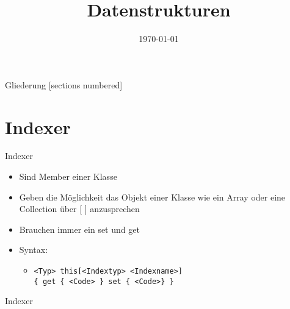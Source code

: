 



\title{Datenstrukturen}
\date{\today}




\maketitle

\begin{frame}{Gliederung}
	[sections numbered]
	\tableofcontents
\end{frame}

\section{Indexer}
\begin{frame}{Indexer}
	\begin{itemize}
		\item Sind Member einer Klasse
		\item Geben die Möglichkeit das Objekt einer Klasse wie ein Array oder eine Collection über \alert{[ ]} anzusprechen
		\item Brauchen immer ein \alert{set} und \alert{get}
		\item Syntax:
		\begin{itemize}
			\item \texttt{\alert{<Typ>} this[\alert{<Indextyp> <Indexname>}]\\ \{ get \{ \alert{<Code>} \} set \{ \alert{<Code>}\} \}}
		\end{itemize}
	\end{itemize}
\end{frame}

\begin{frame}{Indexer}
	
\end{frame}

